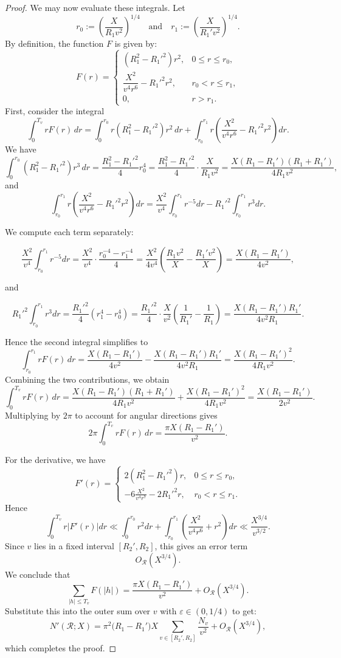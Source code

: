 \documentclass{amsart}
\theoremstyle{plain}
\theoremstyle{definition}
\theoremstyle{remark}
\numberwithin{equation}{section}
\begin{document}
\begin{proof}
We may now evaluate these integrals. Let 
\[
r_0 := \left( \frac{X}{R_1 v^2} \right)^{1/4}
\quad\text{and}\quad
r_1 := \left( \frac{X}{R_1' v^2} \right)^{1/4}.
\]
By definition, the function $F$ is given by:
\[
F(r) = 
\begin{cases} 
(R_1^2 - R_1'^2) r^2, & 0 \le r \le r_0,\\[2mm]
\dfrac{X^2}{v^4 r^6} - R_1'^2 r^2, & r_0 < r \le r_1,\\[1mm]
0, & r > r_1.
\end{cases}
\]
First, consider the integral
\[
\int_0^{T_v} r F(r)\, dr 
= \int_0^{r_0} r (R_1^2 - R_1'^2) r^2\, dr 
+ \int_{r_0}^{r_1} r \left( \frac{X^2}{v^4 r^6} - R_1'^2 r^2 \right) dr.
\]
We have
\[
\int_0^{r_0} (R_1^2 - R_1'^2) r^3\, dr = \frac{R_1^2 - R_1'^2}{4} r_0^4 = \frac{R_1^2 - R_1'^2}{4} \cdot \frac{X}{R_1 v^2} = \frac{X (R_1 - R_1')(R_1 + R_1')}{4 R_1 v^2},
\]
and
\[
\int_{r_0}^{r_1} r \left( \frac{X^2}{v^4 r^6} - R_1'^2 r^2 \right) dr
= \frac{X^2}{v^4} \int_{r_0}^{r_1} r^{-5} dr - R_1'^2 \int_{r_0}^{r_1} r^3 dr.
\]

We compute each term separately:

\[
\frac{X^2}{v^4} \int_{r_0}^{r_1} r^{-5} dr = \frac{X^2}{v^4} \cdot \frac{r_0^{-4} - r_1^{-4}}{4} 
= \frac{X^2}{4 v^4} \left( \frac{R_1 v^2}{X} - \frac{R_1' v^2}{X} \right) 
= \frac{X (R_1 - R_1')}{4 v^2},
\]

and

\[
R_1'^2 \int_{r_0}^{r_1} r^3 dr = \frac{R_1'^2}{4} (r_1^4 - r_0^4) 
= \frac{R_1'^2}{4} \cdot \frac{X}{v^2} \left( \frac{1}{R_1'} - \frac{1}{R_1} \right) 
= \frac{X (R_1 - R_1') R_1'}{4 v^2 R_1}.
\]

Hence the second integral simplifies to
\[
\int_{r_0}^{r_1} r F(r)\, dr = \frac{X (R_1 - R_1')}{4 v^2} - \frac{X (R_1 - R_1') R_1'}{4 v^2 R_1} 
= \frac{X (R_1 - R_1')^2}{4 R_1 v^2}.
\]
\noindent Combining the two contributions, we obtain
\[
\int_0^{T_v} r F(r)\, dr = \frac{X (R_1 - R_1')(R_1 + R_1')}{4 R_1 v^2} + \frac{X (R_1 - R_1')^2}{4 R_1 v^2} = \frac{X (R_1 - R_1')}{2 v^2}.
\]
\noindent Multiplying by \(2\pi\) to account for angular directions gives
\[
2\pi \int_0^{T_v} r F(r)\, dr = \frac{\pi X (R_1 - R_1')}{v^2}.
\]

For the derivative, we have
\[
F'(r) = 
\begin{cases} 
2 (R_1^2 - R_1'^2) r, & 0 \le r \le r_0,\\
-6 \frac{X^2}{v^4 r^7} - 2 R_1'^2 r, & r_0 < r \le r_1.
\end{cases}
\]
Hence
\[
\int_0^{T_v} r |F'(r)| dr \ll \int_0^{r_0} r^2 dr + \int_{r_0}^{r_1} \left( \frac{X^2}{v^4 r^6} + r^2 \right) dr \ll \frac{X^{3/4}}{v^{3/2}}.
\]
\noindent Since \(v\) lies in a fixed interval \([R_2', R_2]\), this gives an error term
\[
O_{\mathcal R}(X^{3/4}).
\]
We conclude that
\[
\sum_{|h|\leq T_v} F(|h|) = \frac{\pi X (R_1 - R_1')}{v^2} + O_{\mathcal R}(X^{3/4}).
\]
Substitute this into the outer sum over $v$ with $\varepsilon\in (0, 1/4)$ to get:
\[
N'(\mathcal R;X)
=
\pi^2\bigl(R_1-R_1'\bigr)
X
\sum_{v\in[R_2',R_2]}
\frac{N_v}{v^2}
+
O_{\mathcal R}(X^{3/4}),
\]
which completes the proof.
\end{proof}
\end{document}
